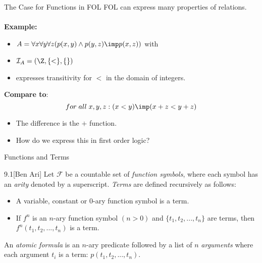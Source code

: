 \begin{slide}[bm=,toc=]{The Case for Functions in FOL}
FOL can express many properties of relations. 
\\~\\
{\bf Example:}
\begin{itemize}
\item $A = \forall x \forall y \forall z (p(x,y) \land p (y,z) \imp p(x,z))$ with
\item $\mathcal{I}_A = (\Z,\{<\},\{\})$
\item expresses transitivity for $<$ in the domain of integers.
\end{itemize}
\vspace{2ex}
{\bf Compare to}:
\[
  for\; all\;  x,y,z: (x < y) \imp (x + z < y + z)
  \]

\vspace{-1ex}
\begin{itemize}
\item The difference is the $+$ function.
\item How do we express this in first order logic?
\end{itemize}

\end{slide}

\begin{wideslide}[bm=,toc=]{Functions and Terms}
\begin{defn}{9.1}[Ben Ari]
Let $\mathcal{F}$ be a countable set of \emph{function symbols}, where
each symbol has an \emph{arity} denoted by a superscript. \emph{Terms} are
defined recursively as follows:
\end{defn}
\vspace{-2ex}
\begin{itemize}
\item A variable, constant or $0$-ary function symbol is a term.
\item If $f^n$ is an $n$-ary function symbol $(n > 0)$ and $\{t_1,t_2,...,t_n\}$
are terms, then $f^n(t_1,t_2,...,t_n)$ is a term.
\end{itemize}
An \emph{atomic formula} is an $n$-ary predicate followed by a list of $n$
\emph{arguments} where each argument $t_i$ is a term: $p(t_1,t_2,...,t_n)$.

\end{wideslide}

